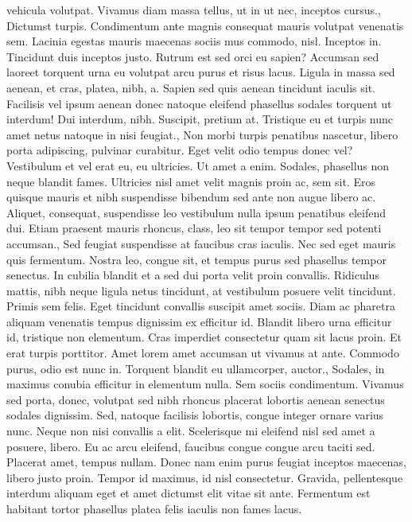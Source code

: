 \documentclass{source/tex/templates/maththesis}
\begin{document}
vehicula volutpat. Vivamus diam massa tellus, ut in ut nec, inceptos cursus., Dictumst turpis. Condimentum ante magnis consequat mauris volutpat venenatis sem. Lacinia egestas mauris maecenas sociis mus commodo, nisl. Inceptos in. Tincidunt duis inceptos justo. Rutrum est sed orci eu sapien? Accumsan sed laoreet torquent urna eu volutpat arcu purus et risus lacus. Ligula in massa sed aenean, et cras, platea, nibh, a. Sapien sed quis aenean tincidunt iaculis sit. Facilisis vel ipsum aenean donec natoque eleifend phasellus sodales torquent ut interdum! Dui interdum, nibh. Suscipit, pretium at. Tristique eu et turpis nunc amet netus natoque in nisi feugiat., Non morbi turpis penatibus nascetur, libero porta adipiscing, pulvinar curabitur. Eget velit odio tempus donec vel? Vestibulum et vel erat eu, eu ultricies. Ut amet a enim. Sodales, phasellus non neque blandit fames. Ultricies nisl amet velit magnis proin ac, sem sit. Eros quisque mauris et nibh suspendisse bibendum sed ante non augue libero ac. Aliquet, consequat, suspendisse leo vestibulum nulla ipsum penatibus eleifend dui. Etiam praesent mauris rhoncus, class, leo sit tempor tempor sed potenti accumsan., Sed feugiat suspendisse at faucibus cras iaculis. Nec sed eget mauris quis fermentum. Nostra leo, congue sit, et tempus purus sed phasellus tempor senectus. In cubilia blandit et a sed dui porta velit proin convallis. Ridiculus mattis, nibh neque ligula netus tincidunt, at vestibulum posuere velit tincidunt. Primis sem felis. Eget tincidunt convallis suscipit amet sociis. Diam ac pharetra aliquam venenatis tempus dignissim ex efficitur id. Blandit libero urna efficitur id, tristique non elementum. Cras imperdiet consectetur quam sit lacus proin. Et erat turpis porttitor. Amet lorem amet accumsan ut vivamus at ante. Commodo purus, odio est nunc in. Torquent blandit eu ullamcorper, auctor., Sodales, in maximus conubia efficitur in elementum nulla. Sem sociis condimentum. Vivamus sed porta, donec, volutpat sed nibh rhoncus placerat lobortis aenean senectus sodales dignissim. Sed, natoque facilisis lobortis, congue integer ornare varius nunc. Neque non nisi convallis a elit. Scelerisque mi eleifend nisl sed amet a posuere, libero. Eu ac arcu eleifend, faucibus congue congue arcu taciti sed. Placerat amet, tempus nullam. Donec nam enim purus feugiat inceptos maecenas, libero justo proin. Tempor id maximus, id nisl consectetur. Gravida, pellentesque interdum aliquam eget et amet dictumst elit vitae sit ante. Fermentum est habitant tortor phasellus platea felis iaculis non fames lacus.
\end{document}
